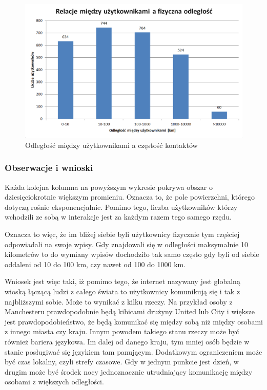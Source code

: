 \begin{figure}[ht!]
\centering
\includegraphics[width=140mm]{img/relacje-a-odleglosc.png}
\caption{Odległość między użytkownikami a częstość kontaktów}
\label{image:relacje-a-odleglosc}
\end{figure}

\subsubsection{Obserwacje i wnioski}
Każda kolejna kolumna na powyższym wykresie pokrywa obszar o dziesięciokrotnie 
większym promieniu. Oznacza to, że pole powierzchni, którego dotyczą rośnie
eksponencjalnie. Pomimo tego, liczba użytkowników którzy wchodzili ze sobą
w interakcje jest za każdym razem tego samego rzędu.

Oznacza to więc, że im bliżej siebie byli użytkownicy fizycznie tym częściej
odpowiadali na swoje wpisy. Gdy znajdowali się w odległości maksymalnie
10 kilometrów to do wymiany wpisów dochodziło tak samo
często gdy byli od siebie oddaleni od 10 do 100 km, czy nawet od 100 do 1000 km.

Wniosek jest więc taki, iż pomimo tego, że internet nazywany jest globalną wioską
łączącą ludzi z całego świata to użytkownicy komunikują się i tak z najbliższymi
sobie. Może to wynikać z kilku rzeczy. Na przykład osoby z Manchesteru 
prawdopodobnie będą kibicami drużyny United lub City i większe jest prawdopodobieństwo,
że będą komunikać się między sobą niż między osobami z innego miasta czy kraju.
Innym powodem takiego stanu rzeczy może być również bariera językowa.
Im dalej od danego kraju, tym mniej osób będzie w stanie posługiwać się językiem
tam panującym. Dodatkowym ograniczeniem może być czas lokalny, czyli strefy czasowe.
Gdy w jednym punkcie jest dzień, w drugim może być środek nocy jednoznacznie 
utrudniający komunikację między osobami z większych odległości.  

